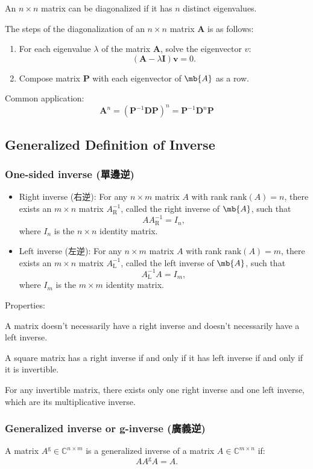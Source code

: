\documentclass[a4paper,12pt]{report}
\begin{document}
An $n\times n$ matrix can be diagonalized if it has $n$ distinct eigenvalues.

The steps of the diagonalization of an $n\times n$ matrix $\mathbf{A}$ is as follows:
\begin{enumerate}
\item For each eigenvalue $\lambda$ of the matrix $\mathbf{A}$, solve the eigenvector $v$:
\[(\mathbf{A} - \lambda \mathbf{I})\mathbf{v} = 0.\]
\item Compose matrix \( \mathbf{P} \) with each eigenvector of $\mb{A}$ as a row.
\end{enumerate}

Common application:
\[\mathbf{A}^n=(\mathbf{P}^{-1}\mathbf{D}\mathbf{P})^n=\mathbf{P}^{-1}\mathbf{D}^n\mathbf{P}\]

\subsection{Generalized Definition of Inverse}
\subsubsection{One-sided inverse (單邊逆)}
\begin{itemize}
\item Right inverse (右逆): For any $n\times m$ matrix $A$ with rank $\mathrm {rank}(A)=n$, there exists an $m\times n$ matrix $A_{\mathrm {R} }^{-1}$, called the right inverse of $\mb{A}$, such that
\[AA_{\mathrm {R} }^{-1}=I_{n},\]
where $I_{n}$ is the $n\times n$ identity matrix.
\item Left inverse (左逆): For any $n\times m$ matrix $A$ with rank $\mathrm {rank}(A)=m$, there exists an $m\times n$ matrix $A_{\mathrm {L} }^{-1}$, called the left inverse of $\mb{A}$, such that
\[A_{\mathrm {L} }^{-1}A=I_{m},\]
where $I_{m}$ is the $m\times m$ identity matrix.
\end{itemize}

Properties:
\bit
\item A matrix doesn't necessarily have a right inverse and doesn't necessarily have a left inverse.
\item A square matrix has a right inverse if and only if it has left inverse if and only if it is invertible.
\item For any invertible matrix, there exists only one right inverse and one left inverse, which are its multiplicative inverse.
\eit
\subsubsection{Generalized inverse or g-inverse (廣義逆)}
A matrix $A^{\mathrm {g} }\in \mathbb {C} ^{n\times m}$ is a generalized inverse of a matrix $A\in \mathbb {C} ^{m\times n}$ if:
\[AA^{\mathrm {g} }A=A.\]
\end{document}

